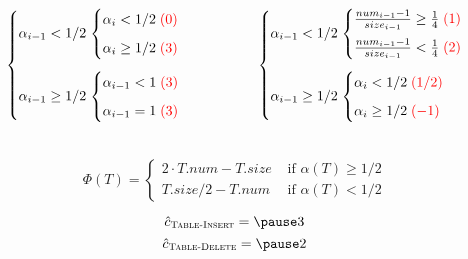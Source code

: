 \begin{frame}{}
  \begin{columns}
      \centerline{\large \textsc{}}

      \[
	\left.
	\begin{cases}
	  \alpha_{i-1} < 1/2 \left.
	  \begin{cases}
	    \alpha_{i} < 1/2 \; \textcolor{red}{(0)}\\[6pt]
	    \alpha_{i} \ge 1/2 \; \textcolor{red}{(3)}
	  \end{cases} \right.
	  \\[20pt]
	  \alpha_{i-1} \ge 1/2 \left.
	    \begin{cases}
	      \alpha_{i-1} < 1 \; \textcolor{red}{(3)} \\[6pt] 
	      \alpha_{i-1} = 1 \; \textcolor{red}{(3)}
	    \end{cases} \right.
	\end{cases} \right.
      \]
      \centerline{\large \textsc{}}

      \[
	\left.
	\begin{cases}
	  \alpha_{i-1} < 1/2 \left.
	    \begin{cases}
	      \frac{num_{i-1} - 1}{size_{i-1}} \ge \frac{1}{4} \; \textcolor{red}{(1)} \\[6pt]
	      \frac{num_{i-1} - 1}{size_{i-1}} < \frac{1}{4} \; \textcolor{red}{(2)}
	    \end{cases} \right.
	  \\[20pt]
	  \alpha_{i-1} \ge 1/2 \left.
	  \begin{cases}
	    \alpha_{i} < 1/2 \; \textcolor{red}{(1/2)} \\[6pt]
	    \alpha_{i} \ge 1/2 \; \textcolor{red}{(-1)}
	  \end{cases} \right.
	\end{cases} \right.
      \]
  \end{columns}

\end{frame}

\begin{frame}{}
  \[
    \Phi(T) = \left.
    \begin{cases}
      2 \cdot T.num - T.size & \text{ if } \alpha(T) \ge 1/2	\\
      T.size/2 - T.num	     & \text{ if } \alpha(T) < 1/2
    \end{cases} \right.
  \]

  \pause
  \vspace{0.500cm}
  \[
    \hat{c}_{\textsc{Table-Insert}} = \pause 3
  \]
  \[
    \hat{c}_{\textsc{Table-Delete}} = \pause 2
  \]
\end{frame}
